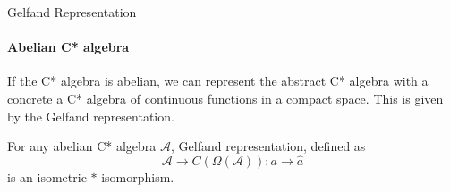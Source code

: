 \documentclass[dvipsnames]{beamer}
\newcommand{\1}{\mathds{1}}	%
\begin{document}
\begin{frame}{Gelfand Representation}
\framesubtitle{Abelian C* algebra}
If the C* algebra is abelian, we can represent the abstract C* algebra with a concrete a C* algebra of continuous functions in a compact space. \pause This is given by the Gelfand representation.
\pause

\begin{theorem}[Gelfand]
  For any abelian C* algebra $\mathcal{A}$, Gelfand representation, defined as $$\mathcal{A} \to C(\Omega(\mathcal{A})): a \to \hat{a}$$
  is an isometric $*$-isomorphism.
\end{theorem}
\end{frame}

%
%
%
%
%
\end{document}

